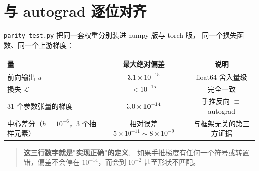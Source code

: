 \section{与 autograd 逐位对齐}

\texttt{parity\_test.py} 把同一套权重分别装进 numpy 版与 torch 版，
同一个损失函数、同一个上游梯度：

\begin{center}
\small
\begin{tabular}{@{}lcc@{}}
\toprule
量 & 最大绝对偏差 & 说明 \\
\midrule
前向输出 $u$ & $3.1\times10^{-15}$ & float64 舍入量级 \\
损失 $\mathcal{L}$ & $<10^{-15}$ & 完全一致 \\
31 个参数张量的梯度 & $\mathbf{3.0\times10^{-14}}$ & 手推反向 $\equiv$ autograd \\
\midrule
中心差分（$h=10^{-6}$，3 个抽样元素） & 相对误差 $5\times10^{-11}\sim8\times10^{-9}$ & 与框架无关的第三方证据 \\
\bottomrule
\end{tabular}
\end{center}

\begin{quote}
\textbf{这三行数字就是"实现正确"的定义}。
如果手推梯度有任何一个符号或转置错，偏差不会停在 $10^{-14}$，而会到 $10^{-2}$ 甚至形状不匹配。
\end{quote}

